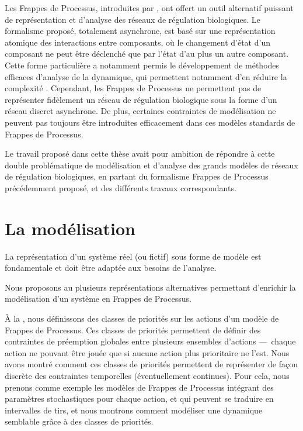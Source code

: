 Les Frappes de Processus, introduites par ,
ont offert un outil alternatif puissant de représentation et d'analyse des
réseaux de régulation biologiques.
Le formalisme proposé, totalement asynchrone, est basé sur une représentation
atomique des interactions entre composants,
où le changement d'état d'un composant ne peut être déclenché que par l'état d'au plus
un autre composant.
Cette forme particulière a notamment permis le développement de méthodes efficaces
d'analyse de la dynamique, qui permettent notamment d'en réduire la complexité \cite{PMR12-MSCS}.
Cependant, les Frappes de Processus ne permettent pas de représenter fidèlement
un réseau de régulation biologique sous la forme d'un réseau discret asynchrone.
De plus, certaines contraintes de modélisation ne peuvent pas toujours être introduites
efficacement dans ces modèles standards de Frappes de Processus.

Le travail proposé dans cette thèse avait pour ambition de répondre à cette double problématique
de modélisation et d'analyse des grands modèles de réseaux de régulation biologiques,
en partant du formalisme Frappes de Processus précédemment proposé,
et des différents travaux correspondants.



\section{La modélisation}

La représentation d'un système réel (ou fictif) sous forme de modèle est fondamentale
et doit être adaptée aux besoins de l'analyse.

\myskip

Nous proposons au  plusieurs représentations alternatives
permettant d'enrichir la modélisation d'un système en Frappes de Processus.

À la , nous définissons des classes de priorités sur les actions
d'un modèle de Frappes de Processus.
Ces classes de priorités permettent de définir des contraintes de préemption globales
entre plusieurs ensembles d'actions ---~chaque action ne pouvant être jouée que si
aucune action plus prioritaire ne l'est.
Nous avons montré comment ces classes de priorités permettent de représenter de façon
discrète des contraintes temporelles (éventuellement continues).
Pour cela, nous prenons comme exemple les modèles de Frappes de Processus intégrant
des paramètres stochastiques pour chaque action,
et qui peuvent se traduire en intervalles de tirs,
et nous montrons comment modéliser une dynamique semblable grâce à des classes de priorités.

